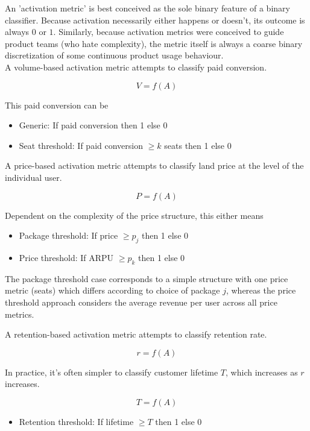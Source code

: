 \documentclass{article}
\begin{document}
An 'activation metric' is best conceived as the sole binary feature of a binary classifier. Because activation necessarily either happens or doesn't, its outcome is always $0$ or $1$. Similarly, because activation metrics were conceived to guide product teams (who hate complexity), the metric itself is always a coarse binary discretization of some continuous product usage behaviour. \\


A volume-based activation metric attempts to classify paid conversion.

\[
V = f(A)
\]


This paid conversion can be

\begin{itemize}
\item Generic: If paid conversion then 1 else 0
\item Seat threshold: If paid conversion $\geq k$ seats then 1 else 0
\end{itemize} 

A price-based activation metric attempts to classify land price at the level of the individual user.

\[
P = f(A)
\]

Dependent on the complexity of the price structure, this either means

\begin{itemize}
\item Package threshold: If price $\geq p_j$ then 1 else 0
\item Price threshold: If ARPU $\geq p_k$ then 1 else 0
\end{itemize}

The package threshold case corresponds to a simple structure with one price metric (seats) which differs according to choice of package $j$, whereas the price threshold approach considers the average revenue per user across all price metrics.



A retention-based activation metric attempts to classify retention rate.

\[
r = f(A)
\]

In practice, it's often simpler to classify customer lifetime $T$, which increases as $r$ increases.

\[
T = f(A)
\]

\begin{itemize}
\item Retention threshold: If lifetime $\geq T$ then 1 else 0
\end{itemize}
\end{document}
